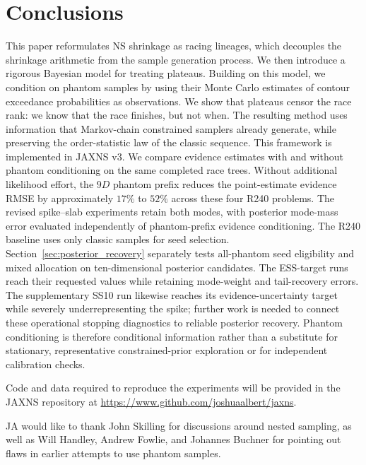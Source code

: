 \documentclass[pdflatex,sn-basic,icol]{sn-jnl}
\theoremstyle{plain}
\theoremstyle{definition}
\begin{document}
\section{Conclusions}\label{sec:conclusion}

This paper reformulates NS shrinkage as racing lineages, which decouples the shrinkage arithmetic from the sample generation process.
We then introduce a rigorous Bayesian model for treating plateaus.
Building on this model, we condition on phantom samples by using their Monte Carlo estimates of contour exceedance probabilities as observations.
We show that plateaus censor the race rank: we know that the race finishes, but not when.
The resulting method uses information that Markov-chain constrained samplers already generate, while preserving the order-statistic law of the classic sequence.
This framework is implemented in JAXNS v3.
We compare evidence estimates with and without phantom conditioning on the same completed race trees.
Without additional likelihood effort, the $9D$ phantom prefix reduces the point-estimate evidence RMSE by approximately $17\%$ to $52\%$ across these four R240 problems.
The revised spike--slab experiments retain both modes, with posterior mode-mass error evaluated independently of phantom-prefix evidence conditioning.
The R240 baseline uses only classic samples for seed selection. Section~\ref{sec:posterior_recovery} separately tests all-phantom seed eligibility and mixed allocation on ten-dimensional posterior candidates. The ESS-target runs reach their requested values while retaining mode-weight and tail-recovery errors. The supplementary SS10 run likewise reaches its evidence-uncertainty target while severely underrepresenting the spike; further work is needed to connect these operational stopping diagnostics to reliable posterior recovery.
Phantom conditioning is therefore conditional information rather than a
substitute for stationary, representative constrained-prior exploration or
for independent calibration checks.

\backmatter


Code and data required to reproduce the experiments will be provided in the JAXNS repository at \url{https://www.github.com/joshuaalbert/jaxns}.


JA would like to thank John Skilling for discussions around nested sampling, as well as Will Handley, Andrew Fowlie, and Johannes Buchner for pointing out flaws in earlier attempts to use phantom samples.
\end{document}
